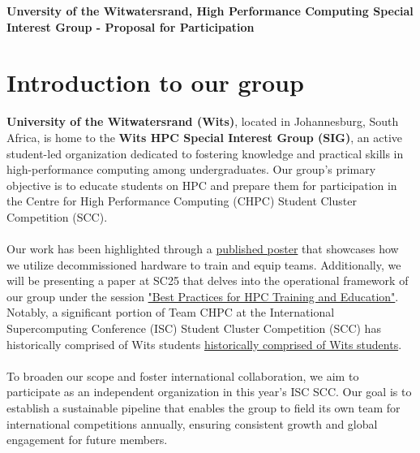 \documentclass[10pt, onecolumn]{IEEEtran}
\begin{document}
\pagestyle{fancy}
\renewcommand{\headrulewidth}{0pt}
\renewcommand{\footrulewidth}{0pt}
\begin{center}
    \LARGE{\textbf{Unversity of the Witwatersrand, High Performance Computing Special Interest Group - Proposal for Participation}}
    \\
\end{center}
\vspace{0.3cm}
  
\renewenvironment{abstract}
 {\par\noindent\textbf{\abstractname:}\ \ignorespaces}
 {\par\medskip}
\section{Introduction to our group}
\noindent
{} \textbf{University of the Witwatersrand (Wits)}, located in Johannesburg, South Africa, is home to the \textbf{Wits HPC Special Interest Group (SIG)}, an active student-led organization dedicated to fostering knowledge and practical skills in high-performance computing among undergraduates. Our group’s primary objective is to educate students on HPC and prepare them for participation in the Centre for High Performance Computing (CHPC) Student Cluster Competition (SCC). 
\\\\
Our work has been highlighted through a \href{https://dl.acm.org/doi/10.1145/3626203.3670573}{published poster} that showcases how we utilize decommissioned hardware to train and equip teams. Additionally, we will be presenting a paper at SC25 that delves into the operational framework of our group under the session \href{https://sc24.conference-program.com/session/?sess=sess752#:~:text=From%20Student%20SIG,PooleDavid%20Macleod} {"Best Practices for HPC Training and Education"}. Notably, a significant portion of Team CHPC at the International Supercomputing Conference (ISC) Student Cluster Competition (SCC) has historically comprised of Wits students \href{https://witshpc.com}{historically comprised of Wits students}. 
\\\\
To broaden our scope and foster international collaboration, we aim to participate as an independent organization in this year’s ISC SCC. Our goal is to establish a sustainable pipeline that enables the group to field its own team for international competitions annually, ensuring consistent growth and global engagement for future members.
\end{document}
